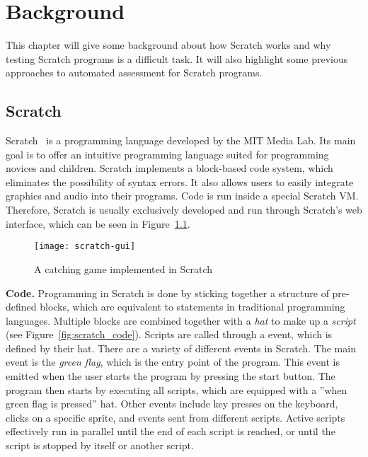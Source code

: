 
\chapter{Background}%
\label{cha:background}

This chapter will give some background about how Scratch works and why testing Scratch programs is a difficult task.
It will also highlight some previous approaches to automated assessment for Scratch programs.

\section{Scratch}%
\label{sec:scratch}

Scratch~\cite{scratch} is a programming language developed by the MIT Media Lab.
Its main goal is to offer an intuitive programming language suited for programming novices and children.
Scratch implements a block-based code system, which eliminates the possibility of syntax errors.
It also allows users to easily integrate graphics and audio into their programs.
Code is run inside a special Scratch VM.
Therefore, Scratch is usually exclusively developed and run through Scratch's web interface, which can be seen in Figure~\ref{fig:scratch_gui}.
\parspace

\begin{figure}[htpb]
    \centering
    \texttt{[image: scratch-gui]}
    \caption{A catching game implemented in Scratch}
    \label{fig:scratch_gui}
\end{figure}

\textbf{Code.}
Programming in Scratch is done by sticking together a structure of pre-defined blocks, which are equivalent to statements in traditional programming languages.
Multiple blocks are combined together with a \textit{hat} to make up a \textit{script} (see Figure~\ref{fig:scratch_code}).
Scripts are called through a event, which is defined by their hat.
There are a variety of different events in Scratch.
The main event is the \textit{green flag}, which is the entry point of the program.
This event is emitted when the user starts the program by pressing the start button.
The program then starts by executing all scripts, which are equipped with a ''when green flag is pressed'' hat.
Other events include key presses on the keyboard, clicks on a specific sprite, and events sent from different scripts.
Active scripts effectively run in parallel until the end of each script is reached, or until the script is stopped by itself or another script.
\parspace

